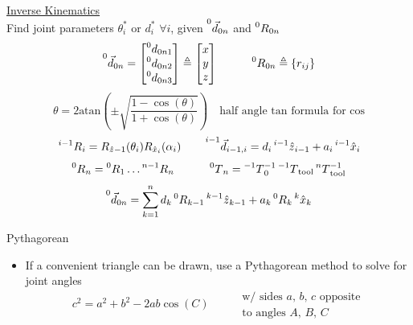 \documentclass[twocolumn, 12pt]{article}    %
\begin{document}
\noindent\underline{Inverse Kinematics}\\
Find joint parameters \(\theta_i^*\) or \(d_i^*\) \(\forall i\), given \(\prescript{0}{}{\vec{d}}_{0n}\) and \(\prescript{0}{}{R}_{0n}\) 
\begin{equation*}
    \prescript{0}{}{\vec{d}_{0n}} = \begin{bmatrix}
        \prescript{0}{}{d}_{0n1} \\ \prescript{0}{}{d}_{0n2} \\ \prescript{0}{}{d}_{0n3}
    \end{bmatrix} \triangleq \begin{bmatrix}
        x \\ y \\ z
    \end{bmatrix} \hspace{30pt} \prescript{0}{}{R}_{0n} \triangleq \{r_{ij}\}
\end{equation*}
\begin{equation*}
    \theta = 2 \text{atan}\left( \pm \sqrt{\frac{1- \cos(\theta)}{1+ \cos(\theta)}}\right) \hspace{8pt} \text{ half angle tan formula for cos}
\end{equation*}
\begin{equation*}
    \prescript{i-1}{}{R}_i = R_{\hat{z}_{}-1}(\theta_i) R_{\hat{x}_i} (\alpha_i) \hspace{20pt} \prescript{i-1}{}{\vec{d}}_{i-1,i} = d_i \prescript{i-1}{}{\hat{z}}_{i-1} + a_i \prescript{i-1}{}{\hat{x}}_i
\end{equation*}
\begin{equation*}
    \prescript{0}{}{R}_n = \prescript{0}{}{R}_1 \dots \prescript{n-1}{}{R}_n \hspace{30pt} \prescript{0}{}{T}_n = \prescript{-1}{}{T}_0^{-1} \prescript{-1}{}{T}_{\text{tool}} \prescript{n}{}{T}_{\text{tool}}^{-1}
\end{equation*}
\begin{equation*}
    \prescript{0}{}{\Vec{d}}_{0n} = \sum_{k=1}^n d_k \prescript{0}{}{R}_{k-1} \prescript{k-1}{}{\hat{z}}_{k-1} + a_k \prescript{0}{}{R}_k \prescript{k}{}{\hat{x}}_k
\end{equation*}

\vspace{-7.5pt}
\noindent Pythagorean
\begin{itemize}
    \item If a convenient triangle can be drawn, use a Pythagorean method to solve for joint angles
    \vspace{-10pt} 
    \begin{equation*}
        c^2 = a^2 + b^2 -2ab\cos(C) \hspace{30pt} \begin{matrix}
            \text{w/ sides } a,\, b,\, c \text{ opposite} \\
            \text{to angles } A,\, B,\, C
        \end{matrix}
    \end{equation*}
\end{itemize}
\end{document}
